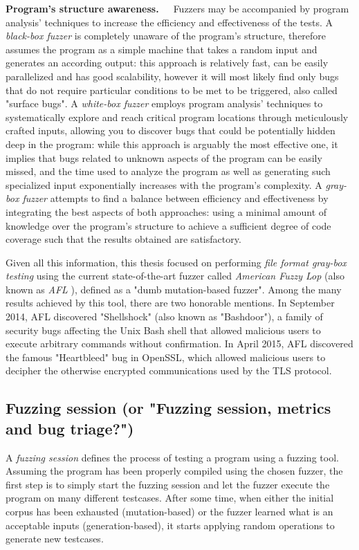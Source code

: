 \textbf{Program's structure awareness.}\ \ \  Fuzzers may be accompanied by program analysis' techniques to increase the efficiency and effectiveness of the tests. A \textit{black-box fuzzer} is completely unaware of the program's structure, therefore assumes the program as a simple machine that takes a random input and generates an according output: this approach is relatively fast, can be easily parallelized and has good scalability, however it will most likely find only bugs that do not require particular conditions to be met to be triggered, also called "surface bugs". A \textit{white-box fuzzer} employs program analysis' techniques to systematically explore and reach critical program locations through meticulously crafted inputs, allowing you to discover bugs that could be potentially hidden deep in the program: while this approach is arguably the most effective one, it implies that bugs related to unknown aspects of the program can be easily missed, and the time used to analyze the program as well as generating such specialized input exponentially increases with the program's complexity.
A \textit{gray-box fuzzer} attempts to find a balance between efficiency and effectiveness by integrating the best aspects of both approaches: using a minimal amount of knowledge over the program's structure to achieve a sufficient degree of code coverage such that the results obtained are satisfactory.




\newpage
Given all this information, this thesis focused on performing \textit{file format gray-box testing} using the current state-of-the-art fuzzer called \textit{American Fuzzy Lop} (also known as \textit{AFL} \cite{AFL}), defined as a "dumb mutation-based fuzzer". Among the many results achieved by this tool, there are two honorable mentions. In September 2014, AFL discovered "Shellshock" \cite{shellshock} (also known as "Bashdoor"), a family of security bugs affecting the Unix Bash shell that allowed malicious users to execute arbitrary commands without confirmation. In April 2015, AFL discovered the famous "Heartbleed" \cite{heartbleed} bug in OpenSSL, which allowed malicious users to decipher the otherwise encrypted communications used by the TLS protocol. 


\subsection{Fuzzing session (or "Fuzzing session, metrics and bug triage?")}
A \textit{fuzzing session} defines the process of testing a program using a fuzzing tool.
Assuming the program has been properly compiled using the chosen fuzzer, the first step is to simply start the fuzzing session and let the fuzzer execute the program on many different testcases. After some time, when either the initial corpus has been exhausted (mutation-based) or the fuzzer learned what is an acceptable inputs (generation-based), it starts applying random operations to generate new testcases. 

